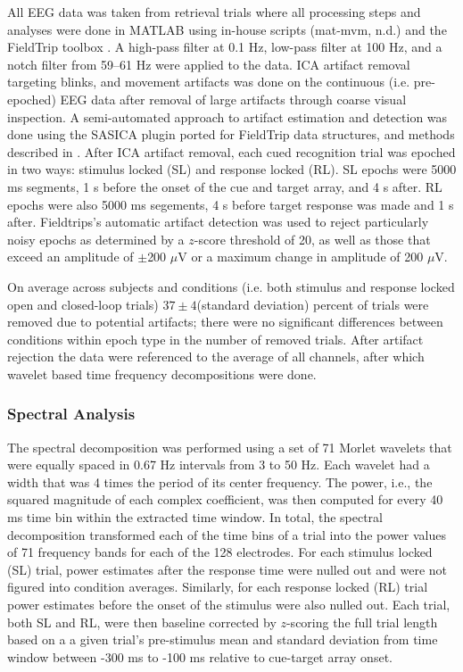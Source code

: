 \documentclass[11pt, titlepage, twoside]{article}
\begin{document}
All EEG data was taken from retrieval trials where all processing steps and analyses were done in MATLAB using in-house scripts (mat-mvm, n.d.) and the FieldTrip toolbox  \parencite{OostenveldFriesMarisEtAl11}. A high-pass filter at 0.1 Hz, low-pass filter at 100 Hz, and a notch filter from 59--61 Hz were applied to the data.  ICA artifact removal targeting blinks, and movement artifacts was done on the continuous (i.e. pre-epoched) EEG data after removal of large artifacts through coarse visual inspection.  A semi-automated approach to artifact estimation and detection was done using the SASICA plugin ported for FieldTrip data structures, and methods described in \textcite{ChaumonBishopBusch15}.  After ICA artifact removal, each cued recognition trial was epoched in two ways: stimulus locked (SL) and response locked (RL).  SL epochs were 5000 ms segments, 1 s before the onset of the cue and target array, and 4 s after. RL epochs were also 5000 ms segements, 4 s before target response was made and 1 s after.  Fieldtrips's automatic artifact detection was used to reject particularly noisy epochs as determined by a $z$-score threshold of 20, as well as those that exceed an amplitude of $\pm$200 $\mu$V or a maximum change in amplitude of 200 $\mu$V. 

On average across subjects and conditions (i.e. both stimulus and response locked open and closed-loop trials) $37\pm4$(standard deviation) percent of trials were removed due to potential artifacts; there were no significant differences between conditions within epoch type in the number of removed trials.  After artifact rejection the data were referenced to the average of all channels, after which wavelet based time frequency decompositions were done.

\subsubsection{Spectral Analysis}
\label{sec:deevSpecAnal}
The spectral decomposition was performed using a set of 71 Morlet wavelets that were equally spaced in 0.67 Hz intervals from 3 to 50 Hz. Each wavelet had a width that was 4 times the period of its center frequency. The power, i.e., the squared magnitude of each complex coefficient, was then computed for every 40 ms time bin within the extracted time window. In total, the spectral decomposition transformed each of the time bins of a trial into the power values of 71 frequency bands for each of the 128 electrodes.  For each stimulus locked (SL) trial, power estimates after the response time were nulled out and were not figured into condition averages.  Similarly, for each response locked (RL) trial power estimates before the onset of the stimulus were also nulled out.  Each trial, both SL and RL, were then baseline corrected by $z$-scoring the full trial length based on a a given trial's pre-stimulus mean and standard deviation from time window between -300 ms to -100 ms relative to cue-target array onset.  
\end{document}
